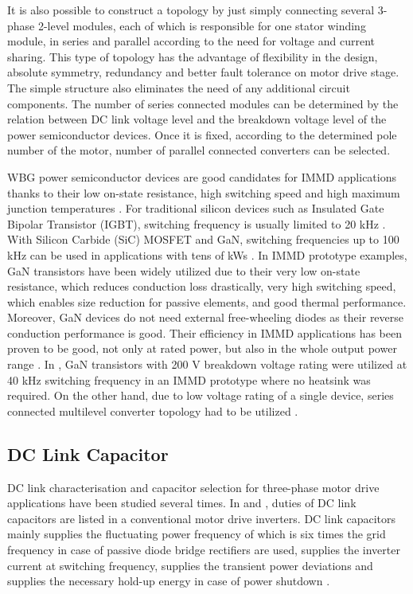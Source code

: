 \documentclass[conference,a4paper,twocolumn]{IEEEtran}
\begin{document}
It is also possible to construct a topology by just simply connecting several 3-phase 2-level modules, each of which is responsible for one stator winding module, in series and parallel according to the need for voltage and current sharing. This type of topology has the advantage of flexibility in the design, absolute symmetry, redundancy and better fault tolerance on motor drive stage. The simple structure also eliminates the need of any additional circuit components. The number of series connected modules can be determined by the relation between DC link voltage level and the breakdown voltage level of the power semiconductor devices. Once it is fixed, according to the determined pole number of the motor, number of parallel connected converters can be selected.

WBG power semiconductor devices are good candidates for IMMD applications thanks to their low on-state resistance, high switching speed and high maximum junction temperatures \cite{Morita2011}. For traditional silicon devices such as Insulated Gate Bipolar Transistor (IGBT), switching frequency is usually limited to 20 kHz \cite{Lambert2015a}. With Silicon Carbide (SiC) MOSFET and GaN, switching frequencies up to 100 kHz can be used in applications with tens of kWs \cite{Wang2015b,Morita2011}. In IMMD prototype examples, GaN transistors have been widely utilized due to their very low on-state resistance, which reduces conduction loss drastically, very high switching speed, which enables size reduction for passive elements, and good thermal performance. Moreover, GaN devices do not need external free-wheeling diodes as their reverse conduction performance is good. Their efficiency in IMMD applications has been proven to be good, not only at rated power, but also in the whole output power range \cite{Morita2011}. In \cite{Wang2015b}, GaN transistors with 200 V breakdown voltage rating were utilized at 40 kHz switching frequency in an IMMD prototype where no heatsink was required. On the other hand, due to low voltage rating of a single device, series connected multilevel converter topology had to be utilized \cite{Wang2013}.

\subsection{DC Link Capacitor}

DC link characterisation and capacitor selection for three-phase motor drive applications have been studied several times. In \cite{Bianchi2003} and \cite{Lee2007}, duties of DC link capacitors are listed in a conventional motor drive inverters. DC link capacitors mainly supplies the fluctuating power frequency of which is six times the grid frequency in case of passive diode bridge rectifiers are used, supplies the inverter current at switching frequency, supplies the transient power deviations and supplies the necessary hold-up energy in case of power shutdown \cite{Bianchi2003}.
\end{document}
